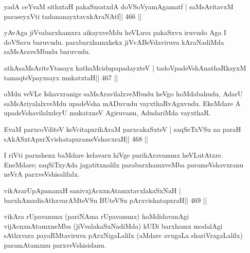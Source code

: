 

\begin{shl}
yadA ceYvaM sithxtaH pakaSxsatxdA doVSoV\s yamAgamatf |
saMsAritavxM paraseyxVti tadananayxtavxkAraNAtf\hfill || 466 ||
\end{shl}

\begin{artha}
yAvAga jiVvabarxhamxra aikayxveMdu heVLuva pakaSxvu iruvudo Aga I
doVSavu baruvudu. parabarxhamxkekx jiVvABeVdaviruva kAraNadiMda
saMsAraveMbudu baruvudu.
\end{artha}

\begin{shl}
athAsaMsAriteYtasayx kathaMcidupapadayxteV |
tadoVpadeVshAnathaRkayxM tamaqteV\s payxsayx mukatxtaH\hfill || 467 ||
\end{shl}

\begin{artha}
oMdu veVLe Ishavxranige saMsAravilalxveMbudu heVgo hoMdabahudu, AdarU saMsAriyalalxveMdu upadeVsha mADuvudu vayxthaRvAguvudu. EkeMdare A upadeVshavilalxdeyU mukatxneV Agiruvanu, AdudariMda vayxthaR.
\end{artha}




\begin{shl}
EvaM parxcoVditeV keVcitapxrihAraM parxcakaSxteV |
saqSeTxVSu na paraH sAkASxtApxrXvishatapxrameVshavxraH\hfill || 468 ||
\end{shl}

\begin{artha}
I riVti parxshenx baMdare kelavaru hiVge parihAravanunx heVLutAtxre. EneMdare; saqSiTxyAda jagatitxnalilx parabarxhamxveMba parameVshavxranu neVrA parxveVshisalilalx.
\end{artha}


\begin{shl}
vikArarUpApananxH sanivxjAcnxnAtamxtavxlakaSxNaH |
barxhAmxdisAthxvarAMteVSu BUteVSu pArxvishatapxraH\hfill || 469 ||
\end{shl}

\begin{artha}
vikAra rUpavanunx (pariNAma rUpavanunx) hoMdidavanAgi vijAcnxnAtamxneMba (jiVvalakaSxNadiMda) kUDi barxhamx modalAgi sAthxvara payaRMtaviruva pArxNigaLalilx (aMdare avugaLa shariVragaLalilx) paramAtamxnu parxveVshisidanu.
\end{artha}

